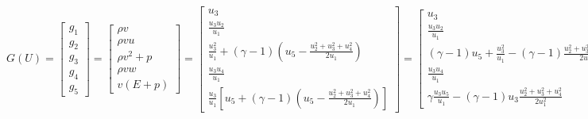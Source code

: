 \documentclass{article}
\begin{document}
\begin{equation}
  G(U) = \left[
    \begin{array}{c}
      g_1 \\
      g_2 \\
      g_3 \\
      g_4 \\
      g_5
    \end{array}
  \right] = \left[
    \begin{array}{c}
      \rho v\\
      \rho v u\\
      \rho v^2 + p\\
      \rho v w\\
      v(E+p)
    \end{array}
  \right] = \left[
    \begin{array}{c}
      u_3\\
      \frac{u_3 u_2}{u_1}\\
      \frac{u_3^2}{u_1} + (\gamma-1) (u_5-\frac{u_2^2+u_3^2+u_4^2}{2u_1})\\
      \frac{u_3 u_4}{u_1}\\
      \frac{u_3}{u_1} [ u_5 + (\gamma-1)(u_5-\frac{u_2^2+u_3^2+u_4^2}{2u_1}) ]
    \end{array}
  \right] = \left[
    \begin{array}{c}
      u_3\\
      \frac{u_3 u_2}{u_1}\\
      (\gamma-1)u_5 + \frac{u_3^2}{u_1} - (\gamma-1)\frac{u_2^2+u_3^2+u_4^2}{2u_1}\\
      \frac{u_3 u_4}{u_1}\\
      \gamma \frac{u_3 u_5}{u_1} - (\gamma-1) u_3 \frac{u_2^2+u_3^2+u_4^2}{2 u_1^2}
    \end{array}
  \right]
\end{equation}
\end{document}
